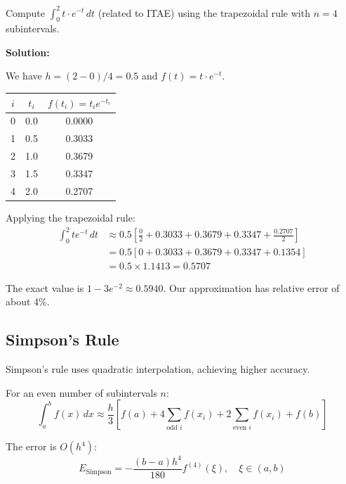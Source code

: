 \begin{examplebox}[title=Example 11.4: Trapezoidal Rule for Integral Performance Index]
Compute $\int_0^2 t \cdot e^{-t}\,dt$ (related to ITAE) using the trapezoidal rule with $n = 4$ subintervals.

\textbf{Solution:}

We have $h = (2-0)/4 = 0.5$ and $f(t) = t \cdot e^{-t}$.

\begin{center}
\begin{tabular}{ccc}
\toprule
$i$ & $t_i$ & $f(t_i) = t_i e^{-t_i}$ \\
\midrule
0 & 0.0 & 0.0000 \\
1 & 0.5 & 0.3033 \\
2 & 1.0 & 0.3679 \\
3 & 1.5 & 0.3347 \\
4 & 2.0 & 0.2707 \\
\bottomrule
\end{tabular}
\end{center}

Applying the trapezoidal rule:
\begin{align}
\int_0^2 te^{-t}\,dt &\approx 0.5 \left[\frac{0}{2} + 0.3033 + 0.3679 + 0.3347 + \frac{0.2707}{2}\right] \\
&= 0.5 [0 + 0.3033 + 0.3679 + 0.3347 + 0.1354] \\
&= 0.5 \times 1.1413 = 0.5707
\end{align}

The exact value is $1 - 3e^{-2} \approx 0.5940$. Our approximation has relative error of about 4\%.
\end{examplebox}

\subsection{Simpson's Rule}

Simpson's rule uses quadratic interpolation, achieving higher accuracy.

\begin{definitionbox}[title=Definition 11.9: Simpson's Rule]
For an even number of subintervals $n$:
\begin{equation}
\boxed{\int_a^b f(x)\,dx \approx \frac{h}{3}\left[f(a) + 4\sum_{\text{odd } i} f(x_i) + 2\sum_{\text{even } i} f(x_i) + f(b)\right]}
\end{equation}

The error is $O(h^4)$:
\begin{equation}
E_{\text{Simpson}} = -\frac{(b-a)h^4}{180} f^{(4)}(\xi), \quad \xi \in (a, b)
\end{equation}
\end{definitionbox}

